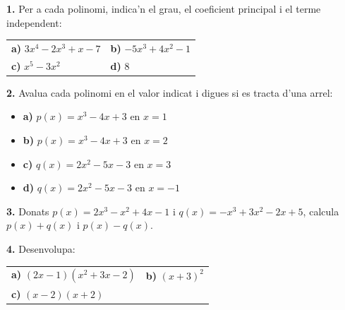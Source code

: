 \documentclass[13pt,a4paper]{extarticle}
\begin{document}
\par\noindent\begin{minipage}{\linewidth}
\textbf{1.} Per a cada polinomi, indica'n el grau, el coeficient principal i el terme independent:\par

\begin{tabular}{@{}p{.46\linewidth}p{.46\linewidth}@{}}
\textbf{a)} $3x^4-2x^3+x-7$ & \textbf{b)} $-5x^3+4x^2-1$ \\[2pt]
\textbf{c)} $x^5-3x^2$ & \textbf{d)} $8$ \\[2pt]
\end{tabular}\par
\end{minipage}\par\vspace{1.6mm}
\par\noindent\begin{minipage}{\linewidth}
\textbf{2.} Avalua cada polinomi en el valor indicat i digues si es tracta d'una arrel:\par

\begin{itemize}[leftmargin=0pt,itemsep=3pt,topsep=3pt,parsep=0pt,label={}]
\item \textbf{a)} $p(x)=x^3-4x+3$ en $x=1$
\item \textbf{b)} $p(x)=x^3-4x+3$ en $x=2$
\item \textbf{c)} $q(x)=2x^2-5x-3$ en $x=3$
\item \textbf{d)} $q(x)=2x^2-5x-3$ en $x=-1$
\end{itemize}
\end{minipage}\par\vspace{1.6mm}
\par\noindent\begin{minipage}{\linewidth}
\textbf{3.} Donats $p(x)=2x^3-x^2+4x-1$ i $q(x)=-x^3+3x^2-2x+5$, calcula $p(x)+q(x)$ i $p(x)-q(x)$.\par
\end{minipage}\par\vspace{1.6mm}
\par\noindent\begin{minipage}{\linewidth}
\textbf{4.} Desenvolupa:\par

\begin{tabular}{@{}p{.46\linewidth}p{.46\linewidth}@{}}
\textbf{a)} $(2x-1)(x^2+3x-2)$ & \textbf{b)} $(x+3)^2$ \\[2pt]
\textbf{c)} $(x-2)(x+2)$ &  \\[2pt]
\end{tabular}\par
\end{minipage}\par\vspace{1.6mm}
\end{document}
